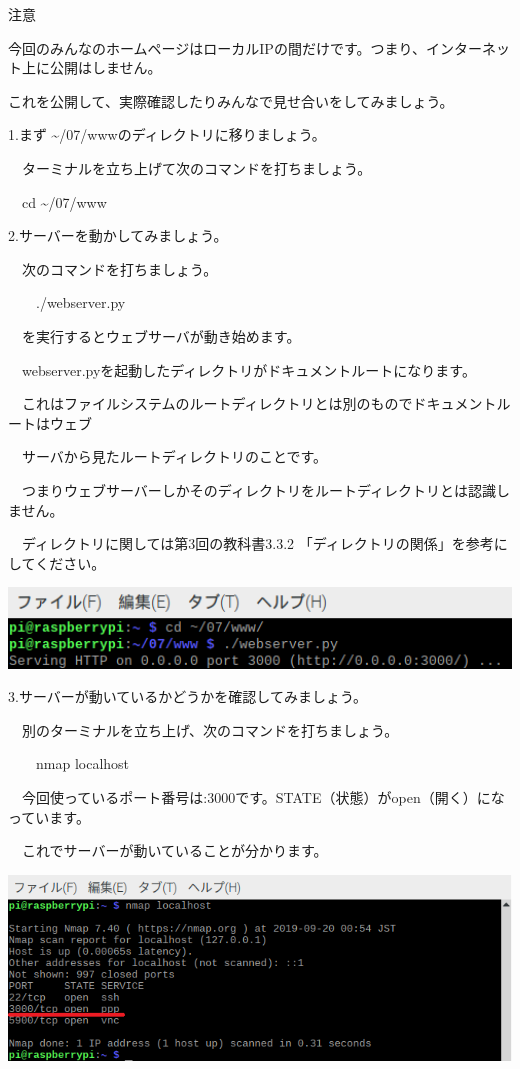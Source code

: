 \documentclass[a4paper,12pt,dvipdfmx]{jarticle}
\begin{document}
注意

今回のみんなのホームページはローカルIPの間だけです。つまり、インターネット上に公開はしません。

これを公開して、実際確認したりみんなで見せ合いをしてみましょう。


\bigskip

1.まず
{\textasciitilde}/07/wwwのディレクトリに移りましょう。

\ \ ターミナルを立ち上げて次のコマンドを打ちましょう。

\ \ cd {\textasciitilde}/07/www


\bigskip

2.サーバーを動かしてみましょう。

\ \ 次のコマンドを打ちましょう。

\ \ 　./webserver.py

\ \ を実行するとウェブサーバが動き始めます。

\ \ webserver.pyを起動したディレクトリがドキュメントルートになります。

\ \ これはファイルシステムのルートディレクトリとは別のものでドキュメントルートはウェブ

\ \ サーバから見たルートディレクトリのことです。

\ \ つまりウェブサーバーしかそのディレクトリをルートディレクトリとは認識しません。

\ \ ディレクトリに関しては第3回の教科書3.3.2 「ディレクトリの関係」を参考にしてください。


\centering
\includegraphics[width=14.986cm]{ome7-img038.png}
\flushleft


\bigskip


\bigskip

3.サーバーが動いているかどうかを確認してみましょう。

\ \ 別のターミナルを立ち上げ、次のコマンドを打ちましょう。

\ \ 　nmap localhost

\ \ 今回使っているポート番号は:3000です。STATE（状態）がopen（開く）になっています。

\ \ これでサーバーが動いていることが分かります。



\centering
\includegraphics[width=16.124cm]{ome7-img039.png}
\flushleft
\end{document}
